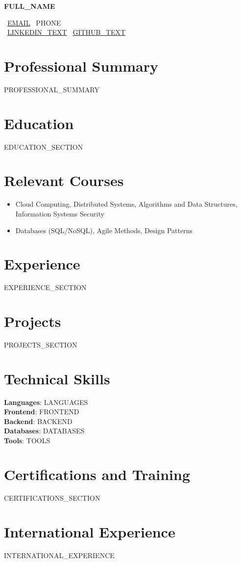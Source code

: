 \documentclass[11pt, letterpaper]{article}
\begin{document}
\begin{center}
    \fontsize{22pt}{22pt}\selectfont \textbf{{FULL_NAME}}
    \vspace{8pt}

    \normalsize
    \faEnvelope\ \href{mailto:{EMAIL}}{{EMAIL}} \quad
    \faPhone\ {PHONE}\\
    \faLinkedin\ \href{{LINKEDIN_URL}}{{LINKEDIN_TEXT}} \quad
    \faGithub\ \href{{GITHUB_URL}}{{GITHUB_TEXT}}
\end{center}

\section{Professional Summary}
{PROFESSIONAL_SUMMARY}

\section{Education}
{EDUCATION_SECTION}

\section{Relevant Courses}
\begin{itemize}[noitemsep,topsep=0pt]
    \item Cloud Computing, Distributed Systems, Algorithms and Data Structures, Information Systems Security
    \item Databases (SQL/NoSQL), Agile Methods, Design Patterns
\end{itemize}

\section{Experience}
{EXPERIENCE_SECTION}

\section{Projects}
{PROJECTS_SECTION}

\section{Technical Skills}
\textbf{Languages}: {LANGUAGES}\\
\textbf{Frontend}: {FRONTEND}\\
\textbf{Backend}: {BACKEND}\\
\textbf{Databases}: {DATABASES}\\
\textbf{Tools}: {TOOLS}\\

\section{Certifications and Training}
{CERTIFICATIONS_SECTION}

\section{International Experience}
{INTERNATIONAL_EXPERIENCE}
\end{document}

